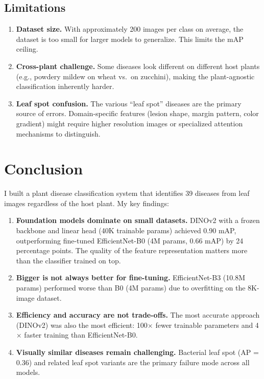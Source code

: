 \documentclass[11pt, a4paper]{article}
\begin{document}
\subsection{Limitations}

\begin{enumerate}
    \item \textbf{Dataset size.} With approximately 200 images per class on average, the dataset is too small for larger models to generalize. This limits the mAP ceiling.
    \item \textbf{Cross-plant challenge.} Some diseases look different on different host plants (e.g., powdery mildew on wheat vs.\ on zucchini), making the plant-agnostic classification inherently harder.
    \item \textbf{Leaf spot confusion.} The various ``leaf spot'' diseases are the primary source of errors. Domain-specific features (lesion shape, margin pattern, color gradient) might require higher resolution images or specialized attention mechanisms to distinguish.
\end{enumerate}

\section{Conclusion}

I built a plant disease classification system that identifies 39 diseases from leaf images regardless of the host plant. My key findings:

\begin{enumerate}
    \item \textbf{Foundation models dominate on small datasets.} DINOv2 with a frozen backbone and linear head (40K trainable params) achieved 0.90 mAP, outperforming fine-tuned EfficientNet-B0 (4M params, 0.66 mAP) by 24 percentage points. The quality of the feature representation matters more than the classifier trained on top.
    \item \textbf{Bigger is not always better for fine-tuning.} EfficientNet-B3 (10.8M params) performed worse than B0 (4M params) due to overfitting on the 8K-image dataset.
    \item \textbf{Efficiency and accuracy are not trade-offs.} The most accurate approach (DINOv2) was also the most efficient: 100$\times$ fewer trainable parameters and 4$\times$ faster training than EfficientNet-B0.
    \item \textbf{Visually similar diseases remain challenging.} Bacterial leaf spot (AP = 0.36) and related leaf spot variants are the primary failure mode across all models.
\end{enumerate}
\end{document}

